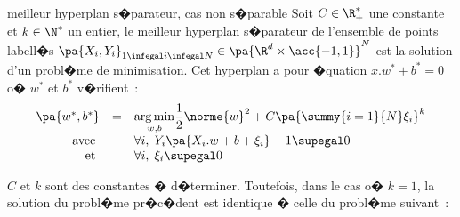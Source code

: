             \begin{xproblem}{meilleur hyperplan s�parateur, cas non s�parable}\label{svm_problem_def_2}
            Soit $C \in \R^*_+$ une constante et $k \in \N^*$ un entier,
            le meilleur hyperplan s�parateur de l'ensemble de points labell�s
            $\pa{X_i,Y_i}_{1 \infegal i \infegal N} \in \pa{ \R^d \times \acc{-1,1} }^N$ est la solution
            d'un probl�me de minimisation. Cet hyperplan a pour �quation $x.w^* + b^* = 0$ o� 
            $w^*$ et $b^*$ v�rifient~:
                    $$
                    \begin{array}{rcl}    \pa{w^*,b^*} &=& \underset{w,b}{\arg \min} \dfrac{1}{2} \norme{w}^2 + 
                                                                                                C \pa{\summy{i=1}{N} \xi_i}^k \\
                                         \text{avec }      && \forall i, \; Y_i \pa{ X_i .w + b + \xi_i } - 1 \supegal 0 \\
                                         \text{et }            && \forall i, \; \xi_i \supegal 0 
                    \end{array}                                        
                    $$
            \end{xproblem}

$C$ et $k$ sont des constantes � d�terminer. Toutefois, dans le cas o� $k = 1$, la solution du probl�me pr�c�dent est identique � celle du probl�me suivant~:


